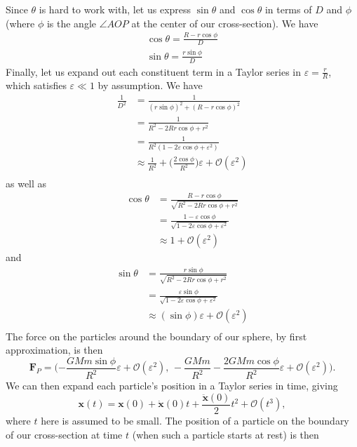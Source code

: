 \documentclass[../the-road-to-reality.tex]{subfiles}
\begin{document}
\begin{questions}
\begin{solution}
		Since $\theta$ is hard to work with, let us express $\sin\theta$ and $\cos\theta$ in terms of $D$ and $\phi$ (where $\phi$ is the angle $\angle{AOP}$ at the center of our cross-section). We have
		\begin{gather*}
			\cos\theta = \frac{R - r\cos\phi}{D} \\
			\sin\theta = \frac{r\sin\phi}{D}
		\end{gather*}
		Finally, let us expand out each constituent term in a Taylor series in $\varepsilon = \frac{r}{R}$, which satisfies $\varepsilon \ll 1$ by assumption. We have
		\begin{align*}
			\frac{1}{D^2} &= \frac{1}{(r\sin\phi)^2 + (R-r\cos\phi)^2} \\
				      &= \frac{1}{R^2 - 2Rr\cos\phi + r^2} \\
				      &= \frac{1}{R^2(1 - 2\varepsilon\cos\phi + \varepsilon^2)} \\
				      &\approx \frac{1}{R^2} + \Big(\frac{2\cos\phi}{R^2}\Big)\varepsilon + \mathcal{O}(\varepsilon^2) \\
		\end{align*}
		as well as
		\begin{align*}
			\cos\theta &= \frac{R - r\cos\phi}{\sqrt{R^2 - 2Rr\cos\phi + r^2}} \\	
				   &= \frac{1 - \varepsilon\cos\phi}{\sqrt{1 - 2\varepsilon\cos\phi + \varepsilon^2}} \\
				   &\approx 1 + \mathcal{O}(\varepsilon^2)
		\end{align*}
		and
		\begin{align*}
			\sin\theta &= \frac{r\sin\phi}{\sqrt{R^2 - 2Rr\cos\phi + r^2}} \\
				   &= \frac{\varepsilon\sin\phi}{\sqrt{1 - 2\varepsilon\cos\phi + \varepsilon^2}} \\
				   &\approx (\sin\phi)\varepsilon + \mathcal{O}(\varepsilon^2) \\
		\end{align*}
		The force on the particles around the boundary of our sphere, by first approximation, is then
		\[
			\mathbf{F}_P = \Big({-\frac{GMm\sin\phi}{R^2}}\varepsilon + \mathcal{O}(\varepsilon^2),\,-\frac{GMm}{R^2} - \frac{2GMm\cos\phi}{R^2}\varepsilon + \mathcal{O}(\varepsilon^2) \Big) 
		.\] 
		We can then expand each particle's position in a Taylor series in time, giving
		\[
			\mathbf{x}(t) = \mathbf{x}(0) + \dot{\mathbf{x}}(0)t + \frac{\ddot{\mathbf{x}}(0)}{2}t^2 + \mathcal{O}(t^3)
		,\] 
		where $t$ here is assumed to be small. The position of a particle on the boundary of our cross-section at time $t$ (when such a particle starts at rest) is then

\end{solution}
\end{questions}
\end{document}
